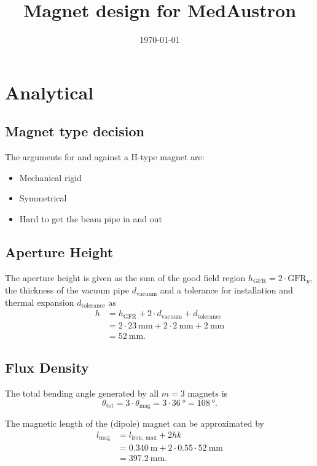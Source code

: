 \documentclass[10pt,a4paper,noendnumber=true]{scrartcl}
\title{Magnet design for MedAustron}
\subtitle{}
\author{}
\date{\today}
\newcommand\pro{\item[$+$]}
\newcommand\con{\item[$-$]}
\begin{document}
\maketitle

\section{Analytical}
\subsection{Magnet type decision}
The arguments for and against a H-type magnet are:
\begin{itemize}
\pro Mechanical rigid
\pro Symmetrical
\con Hard to get the beam pipe in and out
\end{itemize}

\subsection{Aperture Height}
The aperture height is given as the sum of the good field region $h_\text{GFR} = 2\cdot \text{GFR}_y$, the thickness of the vacuum pipe $d_\text{vacuum}$ and a tolerance for installation and thermal expansion $d_\text{tolerance}$ as
\begin{align}
    h &= h_\text{GFR} + 2\cdot d_\text{vacuum} + d_\text{tolerance} \\
      &= 2\cdot\SI{23}{\mm} + 2\cdot \SI{2}{\mm} + \SI{2}{\mm}\nonumber\\ 
      &= \SI{52}{\mm}. \nonumber
\end{align}

\subsection{Flux Density}
The total bending angle generated by all $m=3$ magnets is
\begin{equation}
    \theta_\text{tot} = 3 \cdot \theta_\text{mag} = 3 \cdot \SI{36}{\degree} = \SI{108}{\degree}.
\end{equation}

The magnetic length of the (dipole) magnet can be approximated by
\begin{align}
    l_\text{mag} &= l_\text{iron, max} + 2hk \\
    &= \SI{0.340}{\meter} + 2\cdot 0.55 \cdot \SI{52}{\mm}\nonumber\\
    &= \SI{397.2}{\mm}.\nonumber
\end{align}
\end{document}
